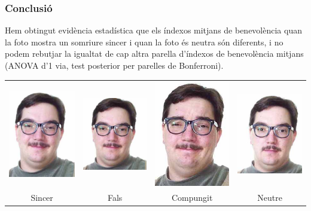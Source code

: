 \documentclass[12pt,t]{beamer}
\theoremstyle{plain}
\theoremstyle{definition}
\begin{document}
\begin{frame}
\frametitle{Conclusió} 

Hem obtingut evidència estadística que els índexos mitjans de benevolència quan  la foto mostra un somriure sincer i quan la foto és neutra són diferents, i no podem rebutjar la igualtat de cap altra parella d'índexos de benevolència mitjans (ANOVA d'1 via, test posterior per parelles de Bonferroni). 
\medskip

\begin{center}
\begin{tabular}{cccc}
\includegraphics[width=0.19\linewidth]{felt} & 
\includegraphics[width=0.21\linewidth]{false} & 
\includegraphics[width=0.173\linewidth]{miserable} & 
\includegraphics[width=0.2\linewidth]{neutral}\\
Sincer & Fals & Compungit & Neutre
\end{tabular}
\end{center}
\end{frame}

 
\end{document}
